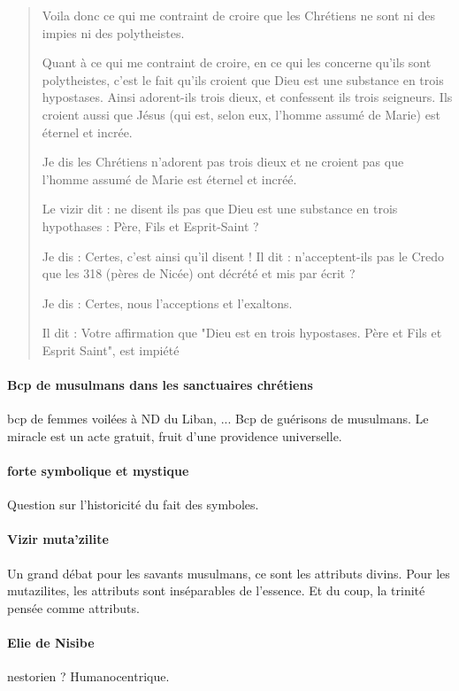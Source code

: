 \begin{quote}
    Voila donc ce qui me contraint de croire que les Chrétiens ne sont ni des impies ni des polytheistes.

    Quant à ce qui me contraint de croire, en ce qui les concerne qu'ils sont polytheistes, c'est le fait qu'ils croient que Dieu est une substance en trois hypostases. Ainsi adorent-ils trois dieux, et confessent ils trois seigneurs. Ils croient aussi que Jésus (qui est, selon eux, l'homme assumé de Marie) est éternel et incrée.

    Je dis les Chrétiens n'adorent pas trois dieux et ne croient pas que l'homme assumé de Marie est éternel et incréé.

    Le vizir dit : ne disent ils pas que Dieu est une substance en trois hypothases : Père, Fils et Esprit-Saint ?

    Je dis : Certes, c'est ainsi qu'il disent !
    Il dit : n'acceptent-ils pas le Credo que les 318 (pères de Nicée) ont décrété et mis par écrit ?

    Je dis : Certes, nous l'acceptions et l'exaltons.

    Il dit : Votre affirmation que "Dieu est en trois hypostases. Père et Fils et Esprit Saint", est impiété 
\end{quote}

\paragraph{Bcp de musulmans dans les sanctuaires chrétiens} bcp de femmes voilées à ND du Liban, ...
Bcp de guérisons de musulmans. Le miracle est un acte gratuit, fruit d'une providence universelle. 

\paragraph{forte symbolique et mystique} Question sur l'historicité du fait des symboles. 


\paragraph{Vizir muta'zilite} Un grand débat pour les savants musulmans, ce sont les attributs divins. \mn{\pageref{par:AttributdivinMutazilite}} Pour les mutazilites, les attributs sont inséparables de l'essence. Et du coup, la trinité pensée comme attributs.

\paragraph{Elie de Nisibe} nestorien ? Humanocentrique. 

